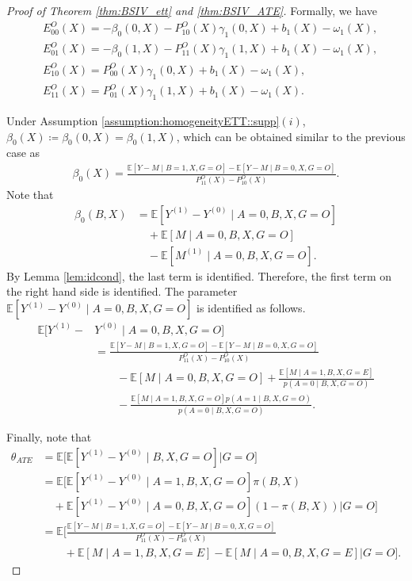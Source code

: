 \documentclass[10pt]{article}
\newcommand{\E}{\mathbb{E}}
\begin{document}
\begin{proof}[Proof of Theorem \ref{thm:BSIV_ett} and \ref{thm:BSIV_ATE}]
Formally, we have
\begin{align*}
&E_{00}^O(X)=-\beta_0(0,X)-P_{10}^O(X)\gamma_1(0,X)+b_1(X)-\omega_1(X),\\
&E_{01}^O(X)=-\beta_0(1,X)-P_{11}^O(X)\gamma_1(1,X)+b_1(X)-\omega_1(X),\\
&E_{10}^O(X)=P_{00}^O(X)\gamma_1(0,X)+b_1(X)-\omega_1(X),\\
&E_{11}^O(X)=P_{01}^O(X)\gamma_1(1,X)+b_1(X)-\omega_1(X).
\end{align*}

Under Assumption \ref{assumption:homogeneityETT::supp}$(i)$, $\beta_0(X)\coloneqq\beta_0(0,X)=\beta_0(1,X)$, which can be obtained similar to the previous case as	  
\begin{align*}
\beta_0(X)=\frac{\E[Y-M\mid B=1,X,G=O]-\E[Y-M\mid B=0,X,G=O]}{P_{11}^O(X)-P_{10}^O(X)}.
\end{align*}	  
Note that
\begin{align*}
\beta_0(B,X)
&=\E[Y^{(1)}-Y^{(0)}\mid A=0,B,X,G=O]\\
&\quad+\E[M\mid A=0,B,X,G=O]\\
&\quad-\E[M^{(1)}\mid A=0,B,X,G=O].
\end{align*}	
By Lemma \ref{lem:idcond}, the last term is identified. Therefore, the first term on the right hand side is identified. The parameter $\E[Y^{(1)}-Y^{(0)}\mid A=0,B,X,G=O]$ is identified as follows.
\begin{align*}
\E[Y^{(1)}-&Y^{(0)}\mid A=0,B,X,G=O]\\
&=%
\frac{\E[Y-M\mid B=1,X,G=O]-\E[Y-M\mid B=0,X,G=O]}{P_{11}^O(X)-P_{10}^O(X)}\\
&\qquad-\E[M\mid A=0,B,X,G=O]+\frac{\E[M\mid A=1,B,X,G=E]}{p(A=0\mid B,X,G=O)}\\
&\qquad-\frac{\E[M\mid A=1,B,X,G=O]p(A=1\mid B,X,G=O)}{p(A=0\mid B,X,G=O)}.%
\end{align*}	  
  
Finally, note that
\begin{align*}
\theta_{ATE}&=\E\big[\E[Y^{(1)}-Y^{(0)}\mid B,X,G=O]\big| G=O\big]\\
&=\E\big[\E[Y^{(1)}-Y^{(0)}\mid A=1,B,X,G=O]\pi(B,X)\\
&\quad+\E[Y^{(1)}-Y^{(0)}\mid A=0,B,X,G=O](1-\pi(B,X))\big|G=O\big]\\
&=\E\Big[
\frac{\E[Y-M\mid B=1,X,G=O]-\E[Y-M\mid B=0,X,G=O]}{P_{11}^O(X)-P_{10}^O(X)}\\
&\qquad+\E[M\mid A=1,B,X,G=E]-\E[M\mid A=0,B,X,G=E]\Big|G=O\Big].
\end{align*}	


\end{proof}
\end{document}
